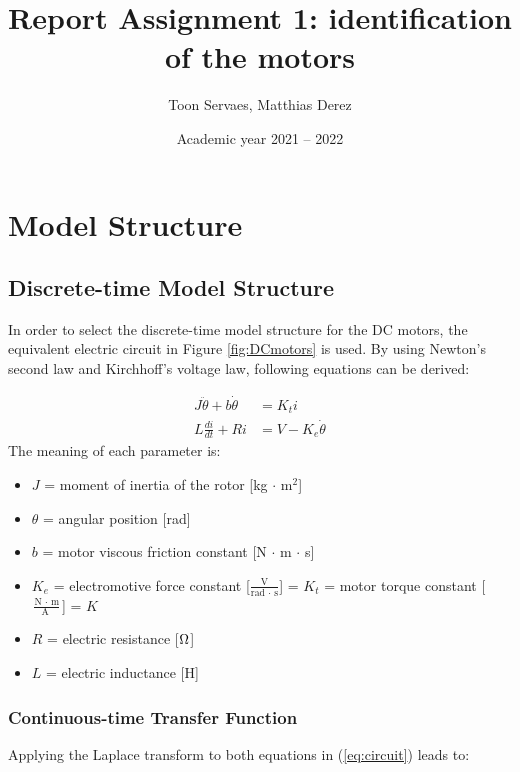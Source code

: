 \documentclass[a4paper,kul]{kulakarticle} %
\date{Academic year 2021 -- 2022}
\title{Report Assignment 1: identification of the motors}
\author{Toon Servaes, Matthias Derez}
\begin{document}
\maketitle

\section{Model Structure}
\subsection{Discrete-time Model Structure} 

In order to select the discrete-time model structure for the DC motors, the equivalent electric circuit in Figure \ref{fig:DCmotors} is used. By using Newton's second law and Kirchhoff's voltage law, following equations can be derived:

\begin{equation}
    \label{eq:circuit}
    \begin{split}
         J\ddot{\theta}  + b\dot{\theta} &= K_{t}i \\
         L\frac{di}{dt} + Ri &= V - K_{e}\dot{\theta}
     \end{split} 
\end{equation}
The meaning of each parameter is:
\begin{itemize}
    \item $J$ = moment of inertia of the rotor [kg $\cdot$ m$^2$]
    \item $\theta$ = angular position [rad]
    \item $b$ = motor viscous friction constant [N $\cdot$ m $\cdot$ s]
    \item $K_{e}$ = electromotive force constant [$\frac{\text{V}}{\text{rad } \cdot \text{ s}}$] = $K_{t}$ = motor torque constant [$\frac{\text{N } \cdot \text{ m}}{\text{A }}$] = $K$
    \item $R$ = electric resistance [$\ohm$]
    \item $L$ = electric inductance [H]
\end{itemize}

\subsubsection*{Continuous-time Transfer Function}
Applying the Laplace transform to both equations in (\ref{eq:circuit}) leads to:
\end{document}
